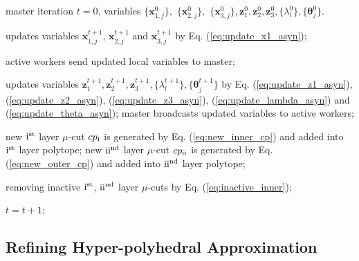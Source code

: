 \documentclass[letterpaper]{article} %
\begin{document}
\begin{algorithm}[t]
\caption{Asynchronous Federated Trilevel Learning}
\begin{algorithmic}
  master iteration $t\! =\! 0$, variables $\{{{\boldsymbol{x}}_{1,j}^0}\},$ $ \{{{\boldsymbol{x}}_{2,j}^0}\}, $ $ \{{{\boldsymbol{x}}_{3,j}^0}\}, \boldsymbol{z}_1^0, \boldsymbol{z}_2^0, \boldsymbol{z}_3^0, \{\lambda_l^0\}, \{\boldsymbol{\theta}_j^0\}$.

\REPEAT

\STATE updates variables $\boldsymbol{x}_{1,j}^{t+1}$, $\boldsymbol{x}_{2,j}^{t+1}$ and $\boldsymbol{x}_{3,j}^{t+1}$ by Eq. (\ref{eq:update_x1_asyn});
\ENDFOR

\STATE active workers send updated local variables to master;

\STATE updates variables $\boldsymbol{z}_1^{t+1}, \boldsymbol{z}_2^{t+1}, \boldsymbol{z}_3^{t+1}, \{\lambda_l^{t+1}\}, \{\boldsymbol{\theta}_j^{t+1}\}$  by Eq. (\ref{eq:update_z1_asyn}), (\ref{eq:update_z2_asyn}), (\ref{eq:update_z3_asyn}), (\ref{eq:update_lambda_asyn}) and (\ref{eq:update_theta_asyn});
\ENDFOR
\STATE master broadcasts updated variables to active workers;


\STATE   new ${\rm{\uppercase\expandafter{\romannumeral1}}}^{\rm{st}}$ layer $\mu$-cut ${cp_{\rm{\uppercase\expandafter{\romannumeral1}}}}$ is generated by Eq. (\ref{eq:new_inner_cp}) and added into ${\rm{\uppercase\expandafter{\romannumeral1}}}^{\rm{st}}$ layer polytope;
\STATE   new ${\rm{\uppercase\expandafter{\romannumeral2}}}^{\rm{nd}}$ layer $\mu$-cut ${cp_{\rm{\uppercase\expandafter{\romannumeral2}}}}$ is generated by Eq. (\ref{eq:new_outer_cp}) and added into ${\rm{\uppercase\expandafter{\romannumeral2}}}^{\rm{nd}}$ layer polytope;

\STATE removing inactive ${\rm{\uppercase\expandafter{\romannumeral1}}}^{\rm{st}}$,  ${\rm{\uppercase\expandafter{\romannumeral2}}}^{\rm{nd}}$ layer $\mu$-cuts by Eq. (\ref{eq:inactive_inner});
\ENDIF


\STATE $t =t+1$;

\end{algorithmic}
\label{algorithm:asyn}
\end{algorithm}

\subsection{Refining Hyper-polyhedral Approximation}
\end{document}
